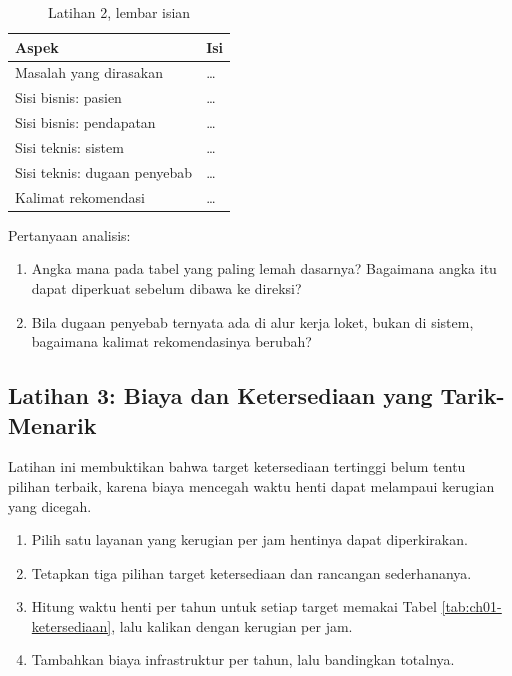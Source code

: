 \begin{table}[!htb]
  \centering
  \footnotesize
  \caption{Latihan 2, lembar isian}
  \label{tab:ch01-lat2-hasil}
  \begin{tabularx}{\textwidth}{P{2.6cm}L}
    \hline
    \textbf{Aspek} & \textbf{Isi} \\
    \hline
    Masalah yang dirasakan & \dots \\
    \hline
    Sisi bisnis: pasien & \dots \\
    \hline
    Sisi bisnis: pendapatan & \dots \\
    \hline
    Sisi teknis: sistem & \dots \\
    \hline
    Sisi teknis: dugaan penyebab & \dots \\
    \hline
    Kalimat rekomendasi & \dots \\
    \hline
  \end{tabularx}
\end{table}

Pertanyaan analisis:
\begin{enumerate}
  \item Angka mana pada tabel yang paling lemah dasarnya? Bagaimana angka itu dapat
        diperkuat sebelum dibawa ke direksi?
  \item Bila dugaan penyebab ternyata ada di alur kerja loket, bukan di sistem,
        bagaimana kalimat rekomendasinya berubah?
\end{enumerate}

\subsection*{Latihan 3: Biaya dan Ketersediaan yang Tarik-Menarik}

Latihan ini membuktikan bahwa target ketersediaan tertinggi belum tentu pilihan terbaik,
karena biaya mencegah waktu henti dapat melampaui kerugian yang dicegah.

\begin{enumerate}
  \item Pilih satu layanan yang kerugian per jam hentinya dapat diperkirakan.
  \item Tetapkan tiga pilihan target ketersediaan dan rancangan sederhananya.
  \item Hitung waktu henti per tahun untuk setiap target memakai Tabel
        \ref{tab:ch01-ketersediaan}, lalu kalikan dengan kerugian per jam.
  \item Tambahkan biaya infrastruktur per tahun, lalu bandingkan totalnya.
\end{enumerate}

